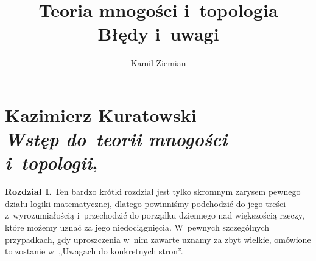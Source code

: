 \documentclass[a4paper,11pt]{article}
\title{Teoria mnogości i~topologia \\
  {\Large Błędy i~uwagi}}
\author{Kamil Ziemian}
\numberwithin{equation}{section}
\begin{document}





\maketitle  %











\section{Kazimierz Kuratowski \\
  \textit{Wstęp do~teorii mnogości i~topologii},
  \cite{KuratowskiWstepTeoriiMnogosciITopologii2004}}

\vspace{0em}



\vspace{0em}


\noindent
\textbf{Rozdział I.} Ten bardzo krótki rozdział jest tylko skromnym zarysem
pewnego działu logiki matematycznej, dlatego powinniśmy podchodzić do jego
treści z~wyrozumiałością i~przechodzić do porządku dziennego nad większością
rzeczy, które możemy uznać za jego niedociągnięcia. W~pewnych szczególnych
przypadkach, gdy uproszczenia w~nim zawarte uznamy za zbyt wielkie, omówione
to zostanie w~„Uwagach do konkretnych stron”.

\VerSpaceFour











\end{document}
